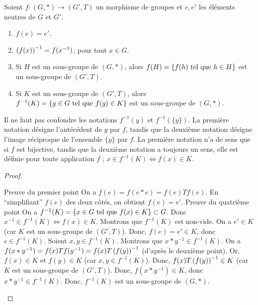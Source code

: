 \documentclass[12pt, a4paper]{report}
\begin{document}
\begin{property}
    Soient $f:(G,*)\to(G',T)$ un morphisme de groupes et $e, e'$ les éléments neutres de $G$ et $G'$.
    \begin{enumerate}
        \item $f(e) = e'$.
        \item $\left(f(x)\right)^{-1} = f(x^{-1})$, pour tout $x \in G$.
        \item Si $H$ est un sous-groupe de $(G,*)$, alors $f(H)=\{f(h) \text{ tel que } h \in H\}$ est un sous-groupe de $(G',T)$.
        \item Si $K$ est un sous-groupe de $(G',T)$, alors $f^{-1}(K) = \{g \in G \text{ tel que } f(g) \in K\}$ est un sous-groupe de $(G,*)$.
    \end{enumerate}
\end{property}

\begin{attention}
    Il ne faut pas confondre les notations $f^{-1}(y)$ et $f^{-1}(\{y\})$. La première notation désigne l'antécédent de $y$ par $f$, tandis que la deuxième notation désigne l'image réciproque de l'ensemble $\{y\}$ par $f$. La première notation n'a de sens que si $f$ est bijective, tandis que la deuxième notation a toujours un sens, elle est définie pour toute application $f$ ; $x \in f^{-1}(K) \iff f(x) \in K$.
\end{attention}

\begin{proof}
    \begin{outline}
        \1 Preuve du premier point
            \2 On a $f(e) = f(e * e) = f(e) T f(e)$.
            \2 En ``simplifiant'' $f(e)$ des deux côtés, on obtient $f(e) = e'$.
        \1 Preuve du quatrième point
            \2 On a $f^{-1}(K) = \{x\in G \text{ tel que } f(x) \in K\} \subset G$.
            \2 Donc $x^{-1} \in f^{-1}(K) \iff f(x) \in K$.
            \2 Montrons que $f^{-1}(K)$ est non-vide.
                \3 On a $e' \in K$ (car $K$ est un sous-groupe de $(G',T)$).
                \3 Donc, $f(e) = e' \in K$, donc $e \in f^{-1}(K)$.
            \2 Soient $x,y \in f^{-1}(K)$. Montrons que $x * y^{-1} \in f^{-1}(K)$.
                \3 On a $f(x*y^{-1}) = f(x) T f(y^{-1}) = f(x) T \left(f(y)\right)^{-1}$ (d'après le deuxième point).
                \3 Or, $f(x) \in K$ et $f(y) \in K$ (car $x,y \in f^{-1}(K)$).
                \3 Donc, $f(x) T \left(f(y)\right)^{-1} \in K$ (car $K$ est un sous-groupe de $(G',T)$).
                \3 Donc, $f(x*y^{-1}) \in K$, donc $x * y^{-1} \in f^{-1}(K)$.
            \2 Donc, $f^{-1}(K)$ est un sous-groupe de $(G,*)$.
    \end{outline}
\end{proof}
\end{document}
